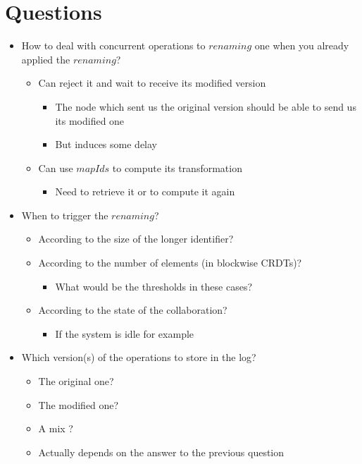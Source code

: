 \documentclass[a4paper]{article}
\begin{document}
\section{Questions}

\begin{itemize}
  \item How to deal with concurrent operations to $renaming$ one when you already applied the $renaming$?
  \begin{itemize}
    \item Can reject it and wait to receive its modified version
    \begin{itemize}
      \item The node which sent us the original version should be able to send us its modified one
      \item But induces some delay
    \end{itemize}
    \item Can use $mapIds$ to compute its transformation
    \begin{itemize}
      \item Need to retrieve it or to compute it again
    \end{itemize}
  \end{itemize}
  \item When to trigger the $renaming$?
  \begin{itemize}
    \item According to the size of the longer identifier?
    \item According to the number of elements (in blockwise \acp{CRDT})?
    \begin{itemize}
      \item What would be the thresholds in these cases?
    \end{itemize}
    \item According to the state of the collaboration?
    \begin{itemize}
      \item If the system is idle for example
    \end{itemize}
  \end{itemize}
  \item Which version(s) of the operations to store in the log?
  \begin{itemize}
    \item The original one?
    \item The modified one?
    \item A mix ?
    \item Actually depends on the answer to the previous question
  \end{itemize}
\end{itemize}


\end{document}
